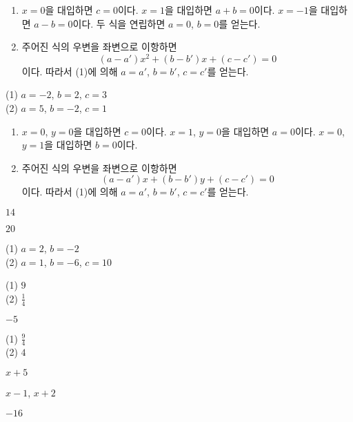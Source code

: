 \documentclass{oblivoir}
\begin{document}
\clearpage
%
\begin{mdframed}
\begin{enumerate}
\item
\(x=0\)을 대입하면 \(c=0\)이다.
\(x=1\)을 대입하면 \(a+b=0\)이다.
\(x=-1\)을 대입하면 \(a-b=0\)이다.
두 식을 연립하면 \(a=0\), \(b=0\)를 얻는다.
\item
주어진 식의 우변을 좌변으로 이항하면 \[(a-a')x^2+(b-b')x+(c-c')=0\]이다.
따라서 (1)에 의해 \(a=a'\), \(b=b'\), \(c=c'\)를 얻는다.
\end{enumerate}
\end{mdframed}

%
(1) \(a=-2\), \(b=2\), \(c=3\)\\
(2) \(a=5\), \(b=-2\), \(c=1\)

\begin{mdframed}
\begin{enumerate}
\item
\(x=0\), \(y=0\)을 대입하면 \(c=0\)이다.
\(x=1\), \(y=0\)을 대입하면 \(a=0\)이다.
\(x=0\), \(y=1\)을 대입하면 \(b=0\)이다.
\item
주어진 식의 우변을 좌변으로 이항하면 \[(a-a')x+(b-b')y+(c-c')=0\]이다.
따라서 (1)에 의해 \(a=a'\), \(b=b'\), \(c=c'\)를 얻는다.
\end{enumerate}
\end{mdframed}

\clearpage
%
\(14\)

%
\(20\)

%
(1) \(a=2\), \(b=-2\)\\
(2) \(a=1\), \(b=-6\), \(c=10\)

%
(1) \(9\)\\
(2) \(\frac14\)

%
\(-5\)

%
(1) \(\frac94\)\\
(2) \(4\)

%
\(x+5\)

%
\(x-1\), \(x+2\)

%
\(-16\)
\end{document}
